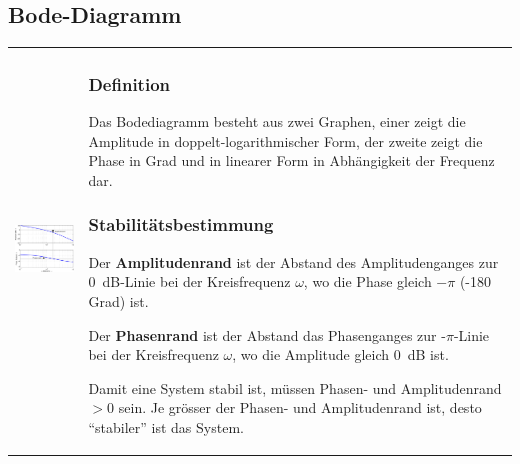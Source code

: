 \subsection{Bode-Diagramm }
\begin{tabular}{ll}
	\parbox{7cm}{
		\includegraphics[width=7cm]{./bilder/bode-stabilitaet.png}
	}
	& \parbox{11cm}{
		\subsubsection{Definition}
		Das Bodediagramm besteht aus zwei Graphen, einer zeigt die Amplitude in
		doppelt-logarithmischer Form, der zweite zeigt die Phase in Grad und in
		linearer Form in Abhängigkeit der Frequenz dar.
		
		\subsubsection{Stabilitätsbestimmung  }
		Der {\bf Amplitudenrand} ist der Abstand des
		Amplitudenganges zur 0~dB-Linie bei der Kreisfrequenz $\omega$, wo die Phase
		gleich $-\pi$ (-180 Grad) ist. \\
		
		Der {\bf Phasenrand} ist der Abstand das Phasenganges zur
		-$\pi$-Linie bei der Kreisfrequenz $\omega$, wo die Amplitude gleich 0~dB
		ist. \\
		
		Damit eine System stabil ist, m\"ussen Phasen- und Amplitudenrand
		$>0$ sein. Je gr\"osser der Phasen- und Amplitudenrand ist, desto
		``stabiler'' ist das System.
	}
\end{tabular}

\newpage 
